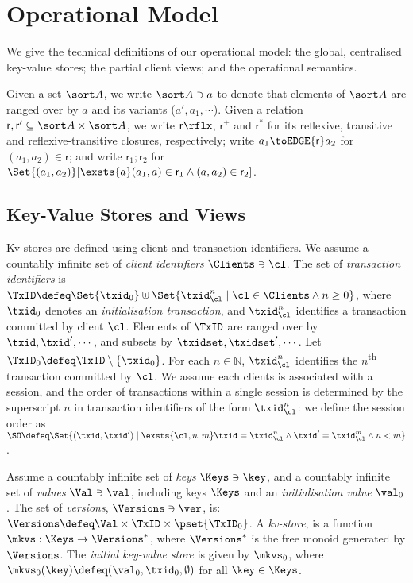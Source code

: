 \section{Operational Model}
\label{sec:model}

We give the technical definitions of our operational model: 
the global, centralised key-value stores; the partial client views;  and the
operational semantics. 

Given a set $\sort A$, we write $\sort A \ni a$ to denote that elements of $\sort A$ are ranged over by $a$ and its variants (\eg $a', a_1, \cdots$). 
Given a relation $\mathsf r, \mathsf r' \subseteq \sort A \times \sort A$,
we write $\mathsf r\rflx$, $\mathsf r^+$ and $\mathsf r^*$ for its reflexive, transitive and reflexive-transitive closures, respectively;
write $a_1 \toEDGE{\mathsf r} a_2$ for $(a_1, a_2) \in \mathsf r$;
and write \( \mathsf r_1 ; \mathsf r_2\) for \( \Set{(a_1,a_2)}[\exsts{a} (a_1,a) \in \mathsf r_1 \land (a,a_2) \in \mathsf r_2]\).

\subsection{Key-Value Stores and Views}
\label{subsec:kvstores}
\label{sec:mkvs-view}
Kv-stores are defined using client and transaction identifiers.
We assume a countably infinite set of \emph{client identifiers} $\Clients \ni \cl$. 
The set of \emph{transaction identifiers} is  
$\TxID \defeq  \Set{\txid_{0}} \uplus \Set{ \txid_{\cl}^{n} \mid \cl
  \in \Clients \land n \geq 0 }$, 
where  $\txid_0$ denotes  an \emph{initialisation transaction}, 
and $\txid_{\cl}^{n}$ identifies a transaction committed by client $\cl$. 
Elements of $\TxID$ are ranged over by
$\txid, \txid', \cdots$, and subsets by $\txidset, \txidset', \cdots$. 
Let $\TxID_{0} \defeq \TxID \setminus \{ \txid_0\}$. 
For each $n \in \mathbb{N}$, $\txid_{\cl}^{n}$ identifies the $n$\textsuperscript{th} transaction  committed by $\cl$.
We assume each clients is associated with a session, 
and the order of transactions within a single session is determined by the superscript 
$n$ in transaction identifiers of the form $\txid_{\cl}^{n}$: we define the session order 
as 
$\SO \defeq \Set{ (\txid, \txid') \mid \exsts{ \cl, n,m } \txid =
  \txid_{\cl}^{n} \land \txid' = \txid_{\cl}^{m} \land n < m}$.

\begin{definition}[Kv-stores]
\label{def:his_heap}
\label{def:mkvs}
Assume a countably infinite set of \emph{keys} $\Keys \ni \key$, 
and a countably infinite set of  \emph{values} $\Val \ni \val$, 
including keys \( \Keys \) and an \emph{initialisation value} $\val_0$.
The set of \emph{versions}, $\Versions \ni \ver$, is: $\Versions \defeq \Val \times \TxID \times \pset{\TxID_{0}}$. 
A \emph{kv-store}, 
is a function $\mkvs: \Keys \to \Versions^{\ast}$, 
where $\Versions^{\ast}$ is the free monoid generated by $\Versions$. 
The \emph{initial key-value store} is given by $\mkvs_0$, where 
$\mkvs_{0}(\key)\defeq  (\val_0, \txid_0, \emptyset)$ for
all $\key \in \Keys$.
\end{definition}

